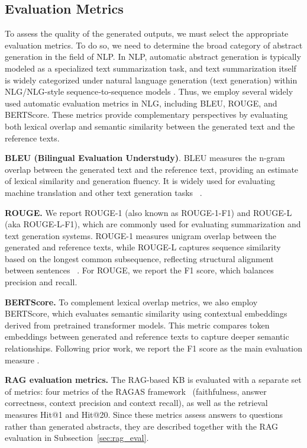 \documentclass[bdcc,article,submit,pdftex,moreauthors]{Definitions/mdpi}
\begin{document}
\subsection{Evaluation Metrics}
\label{sec:metrics}

To assess the quality of the generated outputs, we must select the appropriate evaluation metrics. To do so, we need to determine the broad category of abstract generation in the field of NLP. %
 In NLP, automatic abstract generation is typically modeled as a specialized text summarization task, and text summarization itself is widely categorized under natural language generation (text generation) within NLG/NLG-style sequence‑to‑sequence models \citep{becker2024textgenerationsystematicliterature}. Thus, we employ several widely used automatic evaluation metrics in NLG, including BLEU, ROUGE, and BERTScore. These metrics provide complementary perspectives by evaluating both lexical overlap and semantic similarity between the generated text and the reference texts.

\textbf{BLEU (Bilingual Evaluation Understudy)}.
BLEU measures the n-gram overlap between the generated text and the reference text, providing an estimate of lexical similarity and generation fluency. It is widely used for evaluating machine translation and other text generation tasks ~\cite{papineni2002bleu}.

\textbf{ROUGE.}
We report ROUGE-1 (also known as ROUGE-1-F1) and ROUGE-L (aka ROUGE-L-F1), which are commonly used for evaluating summarization and text generation systems. ROUGE-1 measures unigram overlap between the generated and reference texts, while ROUGE-L captures sequence similarity based on the longest common subsequence, reflecting structural alignment between sentences ~\cite{lin2004rouge}. For ROUGE, we report the F1 score, which balances precision and recall.

\textbf{BERTScore.}
To complement lexical overlap metrics, we also employ BERTScore, which evaluates semantic similarity using contextual embeddings derived from pretrained transformer models. This metric compares token embeddings between generated and reference texts to capture deeper semantic relationships. Following prior work, we report the F1 score as the main evaluation measure \cite{zhang2020bertscore}.

\textbf{RAG evaluation metrics.} The RAG-based KB is evaluated with a separate set of metrics: four metrics of the RAGAS framework~\cite{es2024ragas} (faithfulness, answer correctness, context precision and context recall), as well as the retrieval measures Hit@1 and Hit@20. Since these metrics assess answers to questions rather than generated abstracts, they are described together with the RAG evaluation in Subsection~\ref{sec:rag_eval}.
\end{document}
